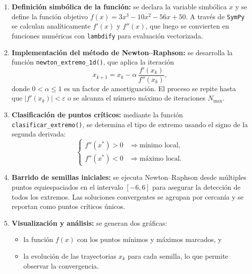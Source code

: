 \documentclass{article}
\begin{document}
\begin{enumerate}
    \item \textbf{Definición simbólica de la función:} se declara la variable simbólica \(x\) y se define la función objetivo
    \(f(x)=3x^3-10x^2-56x+50\). A través de \texttt{SymPy} se calculan analíticamente \(f'(x)\) y \(f''(x)\),
    que luego se convierten en funciones numéricas con \texttt{lambdify} para evaluación vectorizada.
    
    \item \textbf{Implementación del método de Newton--Raphson:} se desarrolla la función
    \texttt{newton\_extremo\_1d()}, que aplica la iteración
    \[
    x_{k+1}=x_k-\alpha\,\frac{f'(x_k)}{f''(x_k)},
    \]
    donde \(0<\alpha\leq1\) es un factor de amortiguación.  
    El proceso se repite hasta que \(|f'(x_k)|<\varepsilon\) o se alcanza el número máximo de iteraciones \(N_{\text{max}}\).
    
    \item \textbf{Clasificación de puntos críticos:} mediante la función \texttt{clasificar\_extremo()},
    se determina el tipo de extremo usando el signo de la segunda derivada:
    \[
    \begin{cases}
    f''(x^*)>0 & \Rightarrow \text{mínimo local},\\[4pt]
    f''(x^*)<0 & \Rightarrow \text{máximo local}.
    \end{cases}
    \]
    
    \item \textbf{Barrido de semillas iniciales:} se ejecuta Newton--Raphson desde múltiples puntos
    equiespaciados en el intervalo \([-6,6]\) para asegurar la detección de todos los extremos.
    Las soluciones convergentes se agrupan por cercanía y se reportan como puntos críticos únicos.
    
    \item \textbf{Visualización y análisis:} se generan dos gráficas:
    \begin{itemize}
        \item la función \(f(x)\) con los puntos mínimos y máximos marcados, y  
        \item la evolución de las trayectorias \(x_k\) para cada semilla, lo que permite observar la convergencia.
    \end{itemize}
\end{enumerate}
\end{document}
